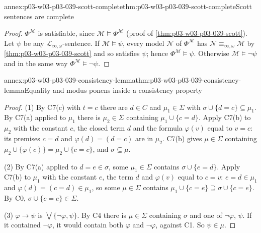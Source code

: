 \begin{annexitem}{annex:p03-w03-p03-039-scott-complete}{thm:p03-w03-p03-039-scott-complete}{Scott sentences are complete}
\begin{proof}
\(\Phi^{\mathcal M}\) is satisfiable, since \(\mathcal M\models\Phi^{\mathcal M}\)
(proof of \cref{thm:p03-w03-p03-039-scott}). Let \(\psi\) be any
\(\mathcal L_{\infty,\omega}\)-sentence. If \(\mathcal M\models\psi\), every
model \(\mathcal N\) of \(\Phi^{\mathcal M}\) has
\(\mathcal N\equiv_{\infty,\omega}\mathcal M\) by
\cref{thm:p03-w03-p03-039-scott} and so satisfies \(\psi\); hence
\(\Phi^{\mathcal M}\models\psi\). Otherwise \(\mathcal M\models\neg\psi\)
and in the same way \(\Phi^{\mathcal M}\models\neg\psi\).
\end{proof}
\end{annexitem}

\begin{annexitem}{annex:p03-w03-p03-039-consistency-lemma}{thm:p03-w03-p03-039-consistency-lemma}{Equality and modus ponens inside a consistency property}
\begin{proof}
(1) By C7(c) with \(t=c\) there are \(d\in C\) and \(\mu_1\in\Sigma\) with
\(\sigma\cup\{d=c\}\subseteq\mu_1\). By C7(a) applied to \(\mu_1\) there is
\(\mu_2\in\Sigma\) containing \(\mu_1\cup\{c=d\}\). Apply C7(b) to
\(\mu_2\) with the constant \(c\), the closed term \(d\) and the formula
\(\varphi(v)\) equal to \(v=c\): its premises \(c=d\) and
\(\varphi(d)=(d=c)\) are in \(\mu_2\). C7(b) gives \(\mu\in\Sigma\) containing
\(\mu_2\cup\{\varphi(c)\}=\mu_2\cup\{c=c\}\), and \(\sigma\subseteq\mu\).

(2) By C7(a) applied to \(d=e\in\sigma\), some \(\mu_1\in\Sigma\) contains
\(\sigma\cup\{e=d\}\). Apply C7(b) to \(\mu_1\) with the constant \(e\),
the term \(d\) and \(\varphi(v)\) equal to \(c=v\): \(e=d\in\mu_1\) and
\(\varphi(d)=(c=d)\in\mu_1\), so some \(\mu\in\Sigma\) contains
\(\mu_1\cup\{c=e\}\supseteq\sigma\cup\{c=e\}\). By C0,
\(\sigma\cup\{c=e\}\in\Sigma\).

(3) \(\varphi\to\psi\) is \(\bigvee\{\neg\varphi,\psi\}\). By C4 there is
\(\mu\in\Sigma\) containing \(\sigma\) and one of \(\neg\varphi\), \(\psi\).
If it contained \(\neg\varphi\), it would contain both \(\varphi\) and
\(\neg\varphi\), against C1. So \(\psi\in\mu\).
\end{proof}
\end{annexitem}

